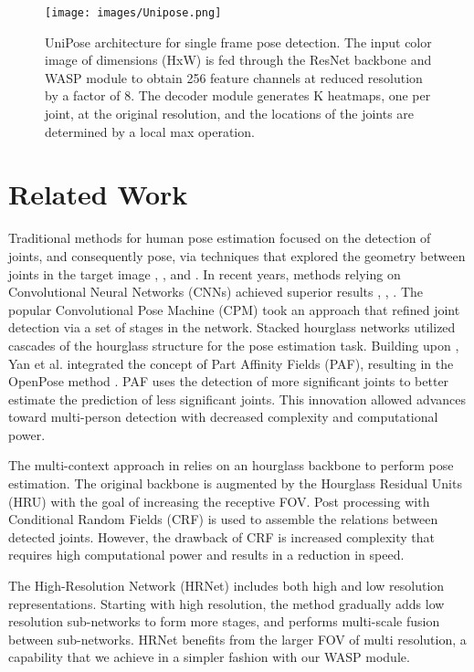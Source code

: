 \documentclass[10pt,twocolumn,letterpaper]{article}
\begin{document}
\begin{figure*}[t]
\begin{center}
\texttt{[image: images/Unipose.png]}
\end{center}
  \caption{UniPose architecture for single frame pose detection. The input color image of dimensions (HxW) is fed through the ResNet backbone and WASP module to obtain 256 feature channels at reduced resolution by a factor of 8. The decoder module generates K heatmaps, one per joint, at the original resolution, and the locations of the joints are determined by a local max operation.}
\label{fig:unipose}
\end{figure*}

\section{Related Work}
Traditional methods for human pose estimation focused on the detection of joints, and consequently pose, via techniques that explored the geometry between joints in the target image \cite{Poselet}, \cite{Articulated}, and \cite{MixtureModels}.
In recent years, methods relying on Convolutional Neural Networks (CNNs) achieved superior results \cite{HRNet}, \cite{OpenPose}, \cite{LCR-Net}. 
The popular Convolutional Pose Machine (CPM) \cite{CPM} took an approach that refined joint detection via a set of stages in the network.
Stacked hourglass networks \cite{HourGlass} utilized cascades of the hourglass structure for the pose estimation task.
Building upon \cite{CPM}, Yan et al. integrated 
the concept of Part Affinity Fields (PAF), resulting in the OpenPose method \cite{OpenPose}. 
PAF uses the detection of more significant joints to better estimate the prediction of less significant joints. This innovation allowed advances toward multi-person detection with decreased complexity and computational power.


The multi-context approach in \cite{Multi-context} relies on an hourglass backbone to perform pose estimation. 
The original backbone
is augmented by
the Hourglass Residual Units (HRU) with the goal of increasing the receptive FOV. 
Post processing with Conditional Random Fields (CRF) is used to assemble the relations between detected joints. However, the drawback of  CRF is increased complexity that requires high computational power and results in a reduction in speed.

The High-Resolution Network (HRNet) \cite{HRNet} includes both high and low resolution representations. Starting with high resolution, the method gradually adds low resolution sub-networks to form more stages, and performs multi-scale fusion between sub-networks. 
HRNet benefits from the larger FOV of multi resolution, a capability that we achieve in a simpler fashion with our WASP module.
\end{document}

